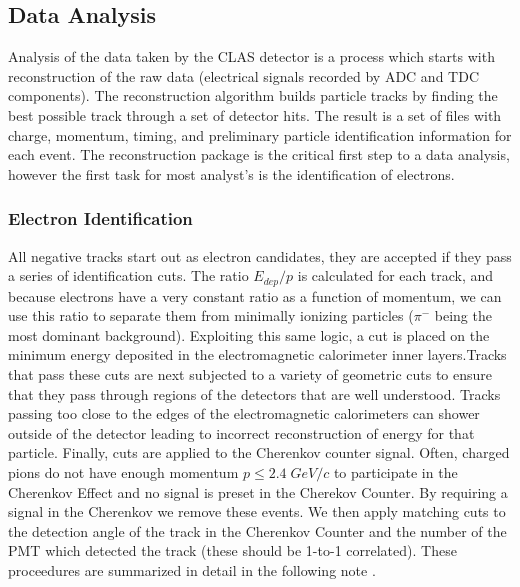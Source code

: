 
\subsection{Data Analysis}
Analysis of the data taken by the CLAS detector is a process which starts with reconstruction of the raw data (electrical signals recorded by ADC and TDC components).  The reconstruction algorithm builds particle tracks by finding the best possible track through a set of detector hits.  The result is a set of files with charge, momentum, timing, and preliminary particle identification information for each event.  The reconstruction package is the critical first step to a data analysis, however the first task for most analyst's is the identification of electrons.

\subsubsection{Electron Identification}
All negative tracks start out as electron candidates, they are accepted if they pass a series of identification cuts. The ratio $E_{dep}/p$ is calculated for each track, and because electrons have a very constant ratio as a function of momentum, we can use this ratio to separate them from minimally ionizing particles ($\pi^{-}$ being the most dominant background).  Exploiting this same logic, a cut is placed on the minimum energy deposited in the electromagnetic calorimeter inner layers.Tracks that pass these cuts are next subjected to a variety of geometric cuts to ensure that they pass through regions of the detectors that are well understood.  Tracks passing too close to the edges of the electromagnetic calorimeters can shower outside of the detector leading to incorrect reconstruction of energy for that particle.  Finally, cuts are applied to the Cherenkov counter signal.  Often, charged pions do not have enough momentum $p \leq 2.4 \; GeV/c$ to participate in the Cherenkov Effect and no signal is preset in the Cherekov Counter.  By requiring a signal in the Cherenkov we remove these events.  We then apply matching cuts to the detection angle of the track in the Cherenkov Counter and the number of the PMT which detected the track (these should be 1-to-1 correlated).  These proceedures are summarized in detail in the following note \cite{electron-note}.


